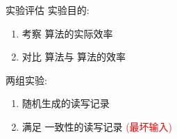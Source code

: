 \begin{frame}{实验评估}
  实验目的:
  \begin{enumerate}
	\item 考察 \readcentric{} 算法的实际效率
	\item 对比 \readcentric{} 算法与 \rwclosure{} 算法的效率
  \end{enumerate}

  \pause
  \vspace{0.50cm}

  两组实验:
  \begin{enumerate}
	\item 随机生成的读写记录
	\item 满足 \PRAM{} 一致性的读写记录 \textcolor{red}{\small (最坏输入)}
  \end{enumerate}
\end{frame}
